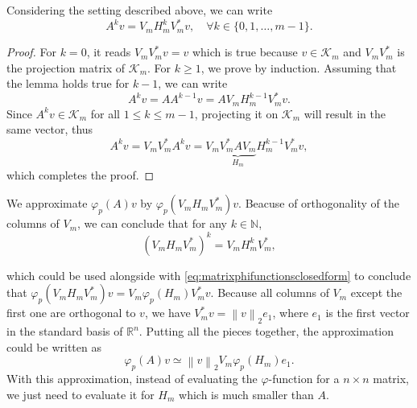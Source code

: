 \begin{lemma}
    \label{lem:krylovsubspacepowered}
    Considering the setting described above, we can write
    \begin{equation}
        A^k v = V_m H_m^k V_m^* v, \quad \forall k \in \{0, 1, \dots, m-1 \}.
    \end{equation}
\end{lemma}

\begin{proof}
    For $k=0$, it reads $V_m V_m^* v = v$ which is true because $v \in \mathcal{K}_m$ and $V_m V_m^*$
    is the projection matrix of $\mathcal{K}_m$. For $k \ge 1$, we prove by induction. Assuming that
    the lemma holds true for $k-1$, we can write
    \begin{equation*}
        A^{k} v = A A^{k-1} v = A V_m H_m^{k-1} V_m^* v.
    \end{equation*}
    Since $A^{k} v \in \mathcal{K}_m$ for all $1 \le k \le m-1$, projecting it on $\mathcal{K}_m$ will result in the same vector,
    thus
    \begin{equation*}
        A^{k} v = V_m V_m^* A^{k} v = V_m \underset{H_m}{\underbrace{V_m^* A V_m}} H_m^{k-1} V_m^* v,
    \end{equation*}
    which completes the proof.
\end{proof}

We approximate $\varphi_p(A)v$ by $\varphi_p(V_m H_m V_m^*)v$. Beacuse of orthogonality of the columns of $V_m$,
we can conclude that for any $k \in \mathbb{N}$,
\begin{equation*}
    \label{eq:reprojectionpower}
    (V_m H_m V_m^*)^{k} = V_m H_m^k V_m^*,
\end{equation*}

which could be used alongside with \eqref{eq:matrixphifunctionsclosedform} to conclude that $\varphi_p(V_m H_m V_m^*)v = V_m \varphi_p(H_m) V_m^* v$.
Because all columns of $V_m$ except the first one are orthogonal to $v$, we have $V_m^* v = \left\| v \right\|_{2} e_1$,
where $e_1$ is the first vector in the standard basis of $\mathbb{R}^n$. Putting all the pieces together, the approximation could be written as
\begin{equation}
    \label{eq:univariatephifunctionapproximation}
    \varphi_p(A)v \simeq \left\| v \right\|_{2} V_m \varphi_p(H_m) e_1.
\end{equation}
With this approximation, instead of evaluating the $\varphi$-function for a $n \times n$ matrix,
we just need to evaluate it for $H_m$ which is much smaller than $A$.

